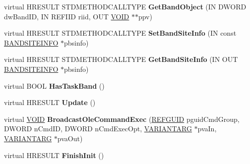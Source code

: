 \begin{DoxyCompactItemize}
\item 
\mbox{\label{class_c_tray_band_site_a6b15f46665e89abc9f95f516f10a18ac}} 
virtual H\+R\+E\+S\+U\+LT S\+T\+D\+M\+E\+T\+H\+O\+D\+C\+A\+L\+L\+T\+Y\+PE {\bfseries Get\+Band\+Object} (IN D\+W\+O\+RD dw\+Band\+ID, IN R\+E\+F\+I\+ID riid, O\+UT \hyperlink{interfacevoid}{V\+O\+ID} $\ast$$\ast$ppv)
\item 
\mbox{\label{class_c_tray_band_site_a3498f7e3cdf646408f21c401a68b8866}} 
virtual H\+R\+E\+S\+U\+LT S\+T\+D\+M\+E\+T\+H\+O\+D\+C\+A\+L\+L\+T\+Y\+PE {\bfseries Set\+Band\+Site\+Info} (IN const \hyperlink{structtag_b_a_n_d_s_i_t_e_i_n_f_o}{B\+A\+N\+D\+S\+I\+T\+E\+I\+N\+FO} $\ast$pbsinfo)
\item 
\mbox{\label{class_c_tray_band_site_a9e4bb7869a2ff636cbbcf457c99fba97}} 
virtual H\+R\+E\+S\+U\+LT S\+T\+D\+M\+E\+T\+H\+O\+D\+C\+A\+L\+L\+T\+Y\+PE {\bfseries Get\+Band\+Site\+Info} (IN O\+UT \hyperlink{structtag_b_a_n_d_s_i_t_e_i_n_f_o}{B\+A\+N\+D\+S\+I\+T\+E\+I\+N\+FO} $\ast$pbsinfo)
\item 
\mbox{\label{class_c_tray_band_site_af67474ee3666e2a044888015b9d0653b}} 
virtual B\+O\+OL {\bfseries Has\+Task\+Band} ()
\item 
\mbox{\label{class_c_tray_band_site_aee45848939fbfbdaaa3643a7d5dd2bca}} 
virtual H\+R\+E\+S\+U\+LT {\bfseries Update} ()
\item 
\mbox{\label{class_c_tray_band_site_aa3d055436ab66a961fb1619ae4221fe5}} 
virtual \hyperlink{interfacevoid}{V\+O\+ID} {\bfseries Broadcast\+Ole\+Command\+Exec} (\hyperlink{struct___g_u_i_d}{R\+E\+F\+G\+U\+ID} pguid\+Cmd\+Group, D\+W\+O\+RD n\+Cmd\+ID, D\+W\+O\+RD n\+Cmd\+Exec\+Opt, \hyperlink{structtag_v_a_r_i_a_n_t}{V\+A\+R\+I\+A\+N\+T\+A\+RG} $\ast$pva\+In, \hyperlink{structtag_v_a_r_i_a_n_t}{V\+A\+R\+I\+A\+N\+T\+A\+RG} $\ast$pva\+Out)
\item 
\mbox{\label{class_c_tray_band_site_a248fdc43f1ba043856114ab0047f9548}} 
virtual H\+R\+E\+S\+U\+LT {\bfseries Finish\+Init} ()
\item 
\mbox{\label{class_c_tray_band_site_aef17429120767a8d4752675db2d18f90}} 
$$
\end{DoxyCompactItemize}
